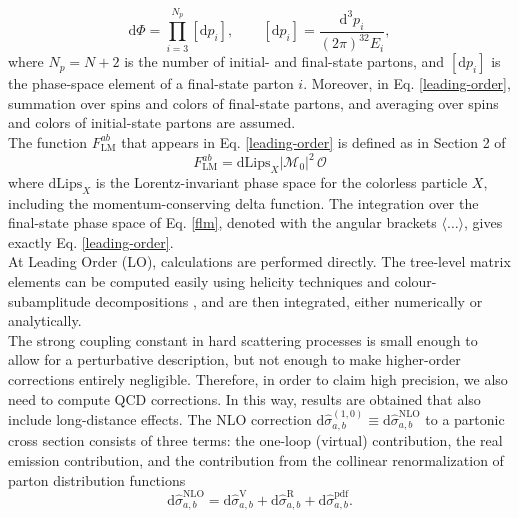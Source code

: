 \documentclass[a4paper, 12pt]{book}
\begin{document}
\begin{equation}
    \mathrm{d}\Phi=\prod_{i=3}^{N_p} [\mathrm{d}p_i], \qquad [\mathrm{d}p_i]=\frac{\mathrm{d}^3p_i}{(2\pi)^32E_i},
\end{equation}
where $N_p=N+2$ is the number of initial- and final-state partons, and $[\mathrm{d}p_i]$ is the phase-space element of a final-state parton $i$. Moreover, in Eq. \ref{leading-order}, summation over spins and colors of final-state partons, and averaging over spins and colors of initial-state partons are assumed.  \\
The function $F^{ab}_{\mathrm{LM}}$ that appears in Eq. \ref{leading-order} is defined as in Section 2 of \cite{Devoto:2023rpv}
\begin{equation}
    F^{ab}_{\mathrm{LM}} = \mathrm{dLips}_X |\mathcal{M}_0|^2 \, \mathcal{O}
    \label{flm}
\end{equation}
where $\mathrm{dLips}_X$ is the Lorentz-invariant phase space for the colorless particle $X$, including the momentum-conserving delta function. The integration over the final-state phase space of Eq. \ref{flm}, denoted with the angular brackets $\langle\dots\rangle$, gives exactly Eq. \ref{leading-order}. \\
At Leading Order (LO), calculations are performed directly. The tree-level matrix elements can be computed easily using helicity techniques and colour-subamplitude decompositions \cite{Altarelli:1977zs}, and are then integrated, either numerically or analytically. \\
The strong coupling constant in hard scattering processes is small enough to allow for a perturbative description, but not enough to make higher-order corrections entirely negligible. Therefore, in order to claim high precision, we also need to compute QCD corrections. In this way, results are obtained that also include long-distance effects.  
The NLO correction $\text{d} \hat{\sigma}_{a,b}^{(1,0)} \equiv \text{d} \hat{\sigma}_{a,b}^{\mathrm{NLO}} $ to a partonic cross section consists of three terms: the one-loop (virtual) contribution, the real emission contribution, and the contribution from the collinear renormalization of parton distribution functions
\begin{equation}
    \mathrm{d} \hat{\sigma}_{a,b}^{\mathrm{NLO}} = \mathrm{d} \hat{\sigma}_{a,b}^{\mathrm{V}} + \mathrm{d} \hat{\sigma}_{a,b}^{\mathrm{R}} + \mathrm{d} \hat{\sigma}_{a,b}^{\mathrm{pdf}}.
\end{equation} 
\end{document}
